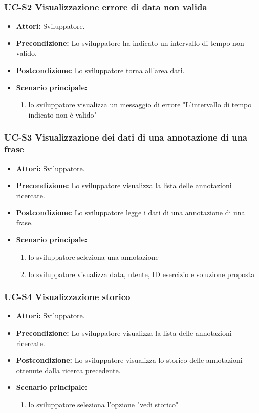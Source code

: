 	\subsubsection{UC-S2 Visualizzazione errore di data non valida}
		\begin{itemize}					
			\item \textbf{Attori:} Sviluppatore.
			\item \textbf{Precondizione:} Lo sviluppatore ha indicato un intervallo di tempo non valido.
			\item \textbf{Postcondizione:} Lo sviluppatore torna all'area dati.
			\item \textbf{Scenario principale:}
				\begin{enumerate}
					\item lo sviluppatore visualizza un messaggio di errore "L'intervallo di tempo indicato non è valido"
				\end{enumerate}
		\end{itemize}
			
	\subsubsection{UC-S3 Visualizzazione dei dati di una annotazione di una frase}
		\begin{itemize}
			\item \textbf{Attori:} Sviluppatore.
			\item \textbf{Precondizione:} Lo sviluppatore visualizza la lista delle annotazioni ricercate.
			\item \textbf{Postcondizione:} Lo sviluppatore legge i dati di una annotazione di una frase.
			\item \textbf{Scenario principale:}
				\begin{enumerate}
					\item lo sviluppatore seleziona una annotazione
					\item lo sviluppatore visualizza data, utente, ID esercizio e soluzione proposta
				\end{enumerate}
		\end{itemize}
	
	\subsubsection{UC-S4 Visualizzazione storico}		
		\begin{itemize}
			\item \textbf{Attori:} Sviluppatore.
			\item \textbf{Precondizione:} Lo sviluppatore visualizza la lista delle annotazioni ricercate.
			\item \textbf{Postcondizione:} Lo sviluppatore visualizza lo storico delle annotazioni ottenute dalla ricerca precedente.
			\item \textbf{Scenario principale:}
			\begin{enumerate}
				\item lo sviluppatore seleziona l'opzione "vedi storico"
			\end{enumerate}
		\end{itemize}	
		
